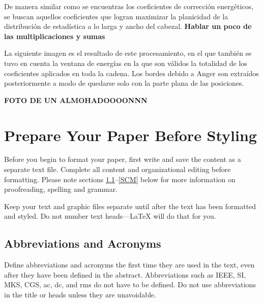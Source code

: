 \documentclass[conference]{IEEEtran}
\begin{document}
De manera similar como se encuentras los coeficientes de corrección energéticos, se buscan aquellos coeficientes que logran maximizar la planicidad de la distribución de estadística a lo larga y ancho del cabezal. 
\textbf{Hablar un poco de las multiplicaciones y sumas}

La siguiente imagen es el resultado de este procesamiento, en el que también se tuvo en cuenta la ventana de energías en la que son válidos la totalidad de los coeficientes aplicados en toda la cadena. Los bordes debido a Anger son extraídos posteriormente a modo de quedarse solo con la parte plana de las posiciones.

\textbf{FOTO DE UN ALMOHADOOOONNN}


\clearpage


\section{Prepare Your Paper Before Styling}
Before you begin to format your paper, first write and save the content as a 
separate text file. Complete all content and organizational editing before 
formatting. Please note sections \ref{AA}--\ref{SCM} below for more information on 
proofreading, spelling and grammar.

Keep your text and graphic files separate until after the text has been 
formatted and styled. Do not number text heads---{\LaTeX} will do that 
for you.

\subsection{Abbreviations and Acronyms}\label{AA}
Define abbreviations and acronyms the first time they are used in the text, 
even after they have been defined in the abstract. Abbreviations such as 
IEEE, SI, MKS, CGS, ac, dc, and rms do not have to be defined. Do not use 
abbreviations in the title or heads unless they are unavoidable.
\end{document}
